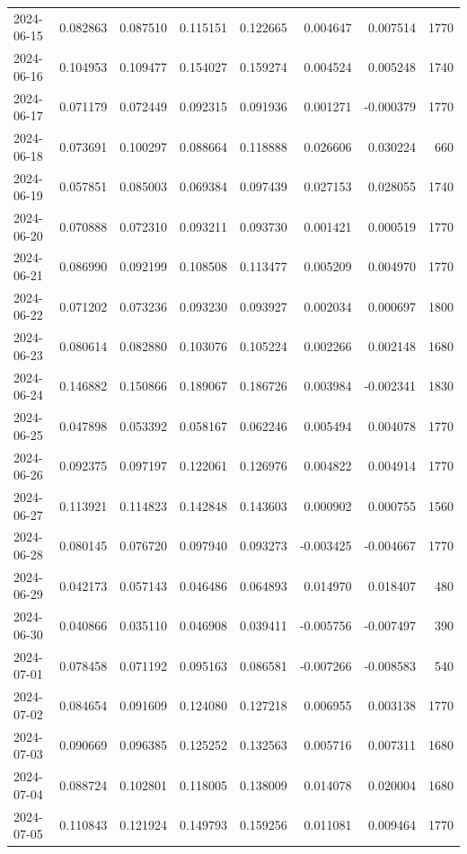 \begin{tabular}{lrrrrrrr}
2024-06-15 & 0.082863 & 0.087510 & 0.115151 & 0.122665 & 0.004647 & 0.007514 & 1770 \\
2024-06-16 & 0.104953 & 0.109477 & 0.154027 & 0.159274 & 0.004524 & 0.005248 & 1740 \\
2024-06-17 & 0.071179 & 0.072449 & 0.092315 & 0.091936 & 0.001271 & -0.000379 & 1770 \\
2024-06-18 & 0.073691 & 0.100297 & 0.088664 & 0.118888 & 0.026606 & 0.030224 & 660 \\
2024-06-19 & 0.057851 & 0.085003 & 0.069384 & 0.097439 & 0.027153 & 0.028055 & 1740 \\
2024-06-20 & 0.070888 & 0.072310 & 0.093211 & 0.093730 & 0.001421 & 0.000519 & 1770 \\
2024-06-21 & 0.086990 & 0.092199 & 0.108508 & 0.113477 & 0.005209 & 0.004970 & 1770 \\
2024-06-22 & 0.071202 & 0.073236 & 0.093230 & 0.093927 & 0.002034 & 0.000697 & 1800 \\
2024-06-23 & 0.080614 & 0.082880 & 0.103076 & 0.105224 & 0.002266 & 0.002148 & 1680 \\
2024-06-24 & 0.146882 & 0.150866 & 0.189067 & 0.186726 & 0.003984 & -0.002341 & 1830 \\
2024-06-25 & 0.047898 & 0.053392 & 0.058167 & 0.062246 & 0.005494 & 0.004078 & 1770 \\
2024-06-26 & 0.092375 & 0.097197 & 0.122061 & 0.126976 & 0.004822 & 0.004914 & 1770 \\
2024-06-27 & 0.113921 & 0.114823 & 0.142848 & 0.143603 & 0.000902 & 0.000755 & 1560 \\
2024-06-28 & 0.080145 & 0.076720 & 0.097940 & 0.093273 & -0.003425 & -0.004667 & 1770 \\
2024-06-29 & 0.042173 & 0.057143 & 0.046486 & 0.064893 & 0.014970 & 0.018407 & 480 \\
2024-06-30 & 0.040866 & 0.035110 & 0.046908 & 0.039411 & -0.005756 & -0.007497 & 390 \\
2024-07-01 & 0.078458 & 0.071192 & 0.095163 & 0.086581 & -0.007266 & -0.008583 & 540 \\
2024-07-02 & 0.084654 & 0.091609 & 0.124080 & 0.127218 & 0.006955 & 0.003138 & 1770 \\
2024-07-03 & 0.090669 & 0.096385 & 0.125252 & 0.132563 & 0.005716 & 0.007311 & 1680 \\
2024-07-04 & 0.088724 & 0.102801 & 0.118005 & 0.138009 & 0.014078 & 0.020004 & 1680 \\
2024-07-05 & 0.110843 & 0.121924 & 0.149793 & 0.159256 & 0.011081 & 0.009464 & 1770 \\

\end{tabular}
